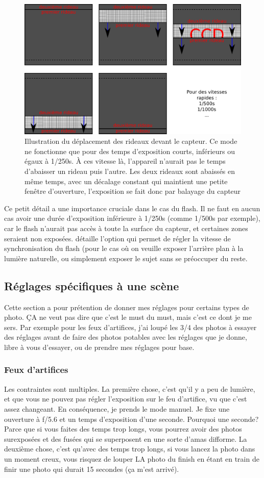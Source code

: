 \documentclass[a4paper,twoside]{article}
\begin{document}
\begin{figure}[htb]
\centering
\includegraphics[width=0.45\linewidth]{figure/first_second_curtain_fast.pdf}
\caption{Illustration du déplacement des rideaux devant le capteur. Ce mode ne fonctionne que pour des temps d'exposition courts, inférieurs ou égaux à 1/250s. À ces vitesse là, l'appareil n'aurait pas le temps d'abaisser un rideau puis l'autre. Les deux rideaux sont abaissés en même temps, avec un décalage constant qui maintient une petite fenêtre d'ouverture, l'exposition se fait donc par balayage du capteur}\label{fig:curtain_slow}
\end{figure}

Ce petit détail a une importance cruciale dans le cas du flash. Il ne faut en aucun cas avoir une durée d'exposition inférieure à 1/250s (comme 1/500s par exemple), car le flash n'aurait pas accès à toute la surface du capteur, et certaines zones seraient non exposées.  détaille l'option qui permet de régler la vitesse de synchronisation du flash (pour le cas où on veuille exposer l'arrière plan à la lumière naturelle, ou simplement exposer le sujet sans se préoccuper du reste.

\subsection{Réglages spécifiques à une scène}
Cette section a pour prétention de donner mes réglages pour certains types de photo. ÇA ne veut pas dire que c'est le must du must, mais c'est ce dont je me sers. Par exemple pour les feux d'artifices, j'ai loupé les 3/4 des photos à essayer des réglages avant de faire des photos potables avec les réglages que je donne, libre à vous d'essayer, ou de prendre mes réglages pour base. 

\subsubsection{Feux d'artifices}
Les contraintes sont multiples. La première chose, c'est qu'il y a peu de lumière, et que vous ne pouvez pas régler l'exposition sur le feu d'artifice, vu que c'est assez changeant. En conséquence, je prends le mode manuel. Je fixe une ouverture à f/5.6 et un temps d'exposition d'une seconde. Pourquoi une seconde? Parce que si vous faites des temps trop longs, vous pourrez avoir des photos surexposées et des fusées qui se superposent en une sorte d'amas difforme. La deuxième chose, c'est qu'avec des temps trop longs, si vous lancez la photo dans un moment creux, vous risquez de louper LA photo du finish en étant en train de finir une photo qui durait 15 secondes (ça m'est arrivé). 
\end{document}
